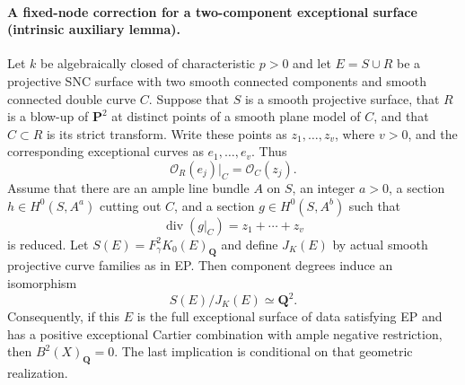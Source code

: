 \paragraph{A fixed-node correction for a two-component exceptional surface
(intrinsic auxiliary lemma).}
Let $k$ be algebraically closed of characteristic $p>0$ and let
$E=S\cup R$ be a projective SNC surface with two smooth connected
components and smooth connected double curve $C$. Suppose that
$S$ is a smooth projective surface, that $R$ is a blow-up of
$\mathbf P^2$ at distinct points of a smooth plane model of $C$,
and that $C\subset R$ is its strict transform. Write these points
as $z_1,\ldots,z_v$, where $v>0$, and the corresponding exceptional
curves as $e_1,\ldots,e_v$. Thus
\[
 \mathcal O_R(e_j)|_C=\mathcal O_C(z_j).
\]
Assume that there are an ample line bundle $A$ on $S$, an integer
$a>0$, a section $h\in H^0(S,A^a)$ cutting out $C$, and a section
$g\in H^0(S,A^b)$ such that
\[
                \operatorname{div}(g|_C)=z_1+\cdots+z_v
                                                        \tag{FN.1}
\]
is reduced. Let $S(E)=F_\gamma^2K_0(E)_{\mathbf Q}$ and define
$J_K(E)$ by actual smooth projective curve families as in EP.
Then component degrees induce an isomorphism
\begin{equation}
                    S(E)/J_K(E)\simeq\mathbf Q^2.      \tag{FN.2}
\end{equation}
Consequently, if this $E$ is the full exceptional surface of data
satisfying EP and has a positive exceptional Cartier combination
with ample negative restriction, then $B^2(X)_{\mathbf Q}=0$.
The last implication is conditional on that geometric realization.

